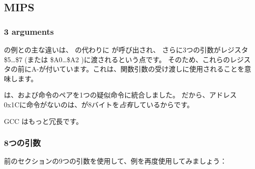 \subsection{MIPS}

\subsubsection{3 arguments}


\q{\HelloWorldSectionName} の例との主な違いは、 \puts の代わりに \printf が呼び出され、
さらに3つの引数がレジスタ \$5\dots \$7 (または \$A0\dots \$A2 )に渡されるという点です。 
そのため、これらのレジスタの前にA-が付いています。これは、関数引数の受け渡しに使用されることを意味します。





\IDA は、および命令のペアを1つの疑似命令に統合しました。 
だから、アドレス0x1Cに命令がないのは、が8バイトを\emph{占有}しているからです。


\NonOptimizing GCC はもっと冗長です。





\subsubsection{8つの引数}

前のセクションの9つの引数を使用して、例を再度使用してみましょう：

